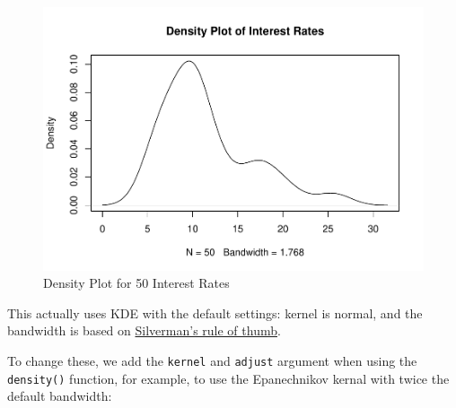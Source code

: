 \documentclass[
]{book}
\newenvironment{Shaded}{\begin{snugshade}}{\end{snugshade}}
\newcommand{\AttributeTok}[1]{\textcolor[rgb]{0.13,0.29,0.53}{#1}}
\newcommand{\DecValTok}[1]{\textcolor[rgb]{0.00,0.00,0.81}{#1}}
\newcommand{\DocumentationTok}[1]{\textcolor[rgb]{0.56,0.35,0.01}{\textbf{\textit{#1}}}}
\newcommand{\FunctionTok}[1]{\textcolor[rgb]{0.13,0.29,0.53}{\textbf{#1}}}
\newcommand{\NormalTok}[1]{#1}
\newcommand{\SpecialCharTok}[1]{\textcolor[rgb]{0.81,0.36,0.00}{\textbf{#1}}}
\newcommand{\StringTok}[1]{\textcolor[rgb]{0.31,0.60,0.02}{#1}}
\begin{document}
\begin{figure}
\centering
\includegraphics{bookdown-demo_files/figure-latex/4-R-1.pdf}
\caption{\label{fig:4-R}Density Plot for 50 Interest Rates}
\end{figure}

This actually uses KDE with the default settings: kernel is normal, and the bandwidth is based on \href{https://en.wikipedia.org/wiki/Kernel_density_estimation\#A_rule-of-thumb_bandwidth_estimator}{Silverman's rule of thumb}.

To change these, we add the \texttt{kernel} and \texttt{adjust} argument when using the \texttt{density()} function, for example, to use the Epanechnikov kernal with twice the default bandwidth:

\begin{Shaded}
\end{Shaded}
\end{document}
